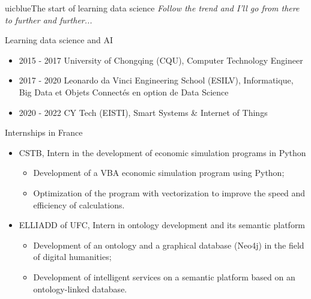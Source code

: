 \documentclass{beamer}
\begin{document}
	\begin{chapter}{uicblue}{The start of learning data science}
		\textit{Follow the trend and I'll go from there to further and further...}
	\end{chapter}
	
	\begin{frame}[fragile]{Learning data science and AI}
		\begin{itemize}[<+->]
			\item 2015 - 2017 University of Chongqing (CQU), Computer Technology Engineer
			\item 2017 - 2020 Leonardo da Vinci Engineering School (ESILV), Informatique, Big Data et Objets Connectés en option de Data Science 
			\item 2020 - 2022 CY Tech (EISTI), Smart Systems \& Internet of Things 
		\end{itemize}
	\end{frame}
	
	\begin{frame}[fragile]{Internships in France}
		\begin{itemize}
			\item CSTB, Intern in the development of economic simulation programs in Python
			\begin{itemize}
				\item Development of a VBA economic simulation program using Python;
				\item Optimization of the program with vectorization to improve the speed and efficiency of calculations.
			\end{itemize}
			\item ELLIADD of UFC, Intern in ontology development and its semantic platform
			\begin{itemize}
				\item Development of an ontology and a graphical database (Neo4j) in the field of digital humanities;
				\item Development of intelligent services on a semantic platform based on an ontology-linked database.
			\end{itemize}
		\end{itemize}
	\end{frame}
	
\end{document}
